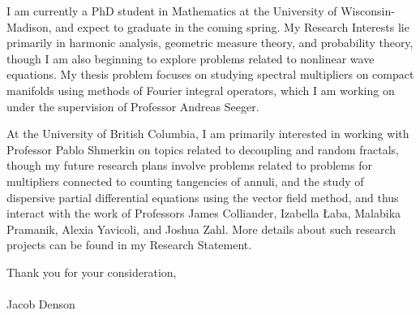 \documentclass[11pt,stdletter,orderfromtodate,sigleft]{newlfm}
\begin{document}
\begin{newlfm}

I am currently a PhD student in Mathematics at the University of Wisconsin-Madison, and expect to graduate in the coming spring. My Research Interests lie primarily in harmonic analysis, geometric measure theory, and probability theory, though I am also beginning to explore problems related to nonlinear wave equations. My thesis problem focuses on studying spectral multipliers on compact manifolds using methods of Fourier integral operators, which I am working on under the supervision of Professor Andreas Seeger.

At the University of British Columbia, I am primarily interested in working with Professor Pablo Shmerkin on topics related to decoupling and random fractals, though my future research plans involve problems related to problems for multipliers connected to counting tangencies of annuli, and the study of dispersive partial differential equations using the vector field method, and thus interact with the work of Professors James Colliander, Izabella {\L}aba, Malabika Pramanik, Alexia Yavicoli, and Joshua Zahl. More details about such research projects can be found in my Research Statement.

Thank you for your consideration,\\\\
Jacob Denson

\end{newlfm}
\end{document}

